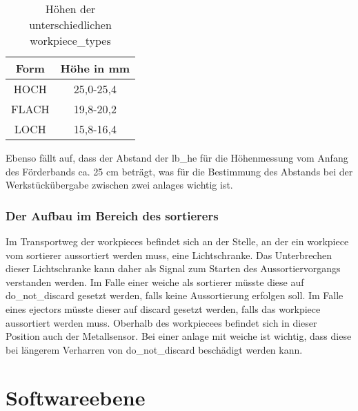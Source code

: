 \begin{table}[h]
    \begin{center}
        \begin{tabular}{ |c|c| }
            \hline
            Form                     & Höhe in mm \\
            \hline\hline
            HOCH                 &  25,0-25,4\\
            \hline
            FLACH                     & 19,8-20,2 \\
            \hline
            LOCH               & 15,8-16,4 \\
            \hline
        \end{tabular}
    \end{center}
    \caption{Höhen der unterschiedlichen \glspl{workpiece_type}}
    \label{tab:werkstuecke}
\end{table}

Ebenso fällt auf, dass der Abstand der \gls{lb_he} für die Höhenmessung vom Anfang des Förderbands ca. 25 cm beträgt,
was für die Bestimmung des Abstands bei der Werkstückübergabe zwischen zwei \glspl{anlage} wichtig ist.

\subsubsection{Der Aufbau im Bereich des \gls{sortierer}s}

Im Transportweg der \Glspl{workpiece} befindet sich an der Stelle, an der ein \Gls{workpiece} vom \gls{sortierer} aussortiert
werden muss, eine Lichtschranke.
Das Unterbrechen dieser Lichtschranke kann daher als Signal zum Starten des Aussortiervorgangs verstanden werden.
Im Falle einer \gls{weiche} als \gls{sortierer} müsste diese auf \gls{do_not_discard} gesetzt werden, falls keine Aussortierung erfolgen soll.
Im Falle eines \Gls{ejector}s müsste dieser auf \gls{discard} gesetzt werden, falls das \Gls{workpiece} aussortiert werden muss.
Oberhalb des \Gls{workpiece}es befindet sich in dieser Position auch der Metallsensor.
Bei einer \gls{anlage} mit \gls{weiche} ist wichtig, dass diese bei längerem Verharren von \gls{do_not_discard} beschädigt werden kann.

\section{Softwareebene}\label{sec:softwareebene}


